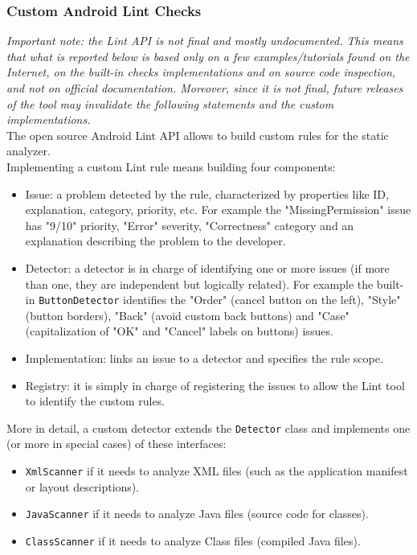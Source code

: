 \documentclass[11pt,a4paper,notitlepage]{article}
\begin{document}
\subsubsection{Custom Android Lint Checks}
\textit{Important note: the Lint API is not final and mostly undocumented. This means that what is reported below is based only on a few examples/tutorials found on the Internet, on the built-in checks implementations and on source code inspection, and not on official documentation. Moreover, since it is not final, future releases of the tool may invalidate the following statements and the custom implementations.}\bigskip \\
The open source Android Lint API allows to build custom rules for the static analyzer.\medskip \\
Implementing a custom Lint rule means building four components:
\begin{itemize}
	\item Issue: a problem detected by the rule, characterized by properties like ID, explanation, category, priority, etc. For example the "MissingPermission" issue has "9/10" priority, "Error" severity, "Correctness" category and an explanation describing the problem to the developer.
	\item Detector: a detector is in charge of identifying one or more issues (if more than one, they are independent but logically related). For example the built-in \texttt{ButtonDetector} identifies the "Order" (cancel button on the left), "Style" (button borders), "Back" (avoid custom back buttons) and "Case" (capitalization of "OK" and "Cancel" labels on buttons) issues.
	\item Implementation: links an issue to a detector and specifies the rule scope.
	\item Registry: it is simply in charge of registering the issues to allow the Lint tool to identify the custom rules.
\end{itemize}\bigskip
More in detail, a custom detector extends the \texttt{Detector} class and implements one (or more in special cases) of these interfaces:
\begin{itemize}
	\item \texttt{XmlScanner} if it needs to analyze XML files (such as the application manifest or layout descriptions).
	\item \texttt{JavaScanner} if it needs to analyze Java files (source code for classes).
	\item \texttt{ClassScanner} if it needs to analyze Class files (compiled Java files).
\end{itemize}
\end{document}
